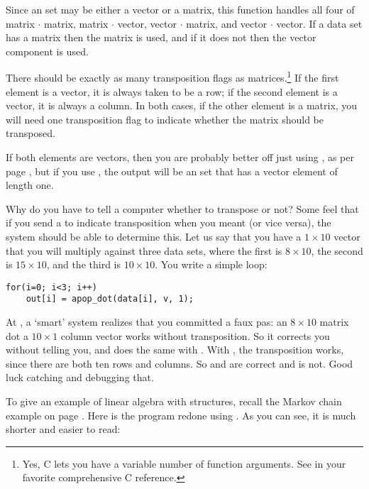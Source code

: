 Since an  set may be either a vector or a matrix, this
function handles all four of matrix $\cdot$ matrix,
matrix $\cdot$ vector, vector $\cdot$ matrix, and vector $\cdot$ vector.
If a data set has a matrix then the matrix is used, and if it does not
then the vector component is used.

There should be exactly as many transposition flags as
matrices.\footnote{Yes, C lets you have a variable number of function
arguments. See  in your favorite comprehensive
C reference.}
If the first element is a vector, it is always taken to be a row;
if the second element is a vector, it is always a column. In both cases,
if the other element is a matrix, you will need one transposition flag
to indicate whether the matrix should be transposed.

If both elements are vectors, then you are probably better off just
using  , as per page \pageref{ddot}, but if you use
, the output will be an  set that has
a vector element of length one.

Why do you have to tell a computer whether to transpose or not? Some
feel that if you
send a  to indicate transposition when you meant  (or vice versa), the system should be able to
determine this. Let us say that you have a $1\times 10$ vector that you
will multiply against three data sets, where the first is $8 \times 10$,
the second is $15 \times 10$, and the third is $10 \times 10$. You write
a simple  loop:
\begin{lstlisting}
for(i=0; i<3; i++)
    out[i] = apop_dot(data[i], v, 1);
\end{lstlisting}
At , a `smart' system realizes that you committed a faux pas:
an $8 \times 10$ matrix dot a $10 \times 1$ column vector works without
transposition. So it corrects you without telling you, and does the same
with . With , the transposition works, since
there are both ten rows and columns. So  and  are
correct and  is not. Good luck catching and debugging that.

To give an example of linear algebra with  structures,
recall the Markov chain example on page \pageref{markov}. Here is the
program redone using . As you can see, it is much shorter
and easier to read: \label{markovtwo}


